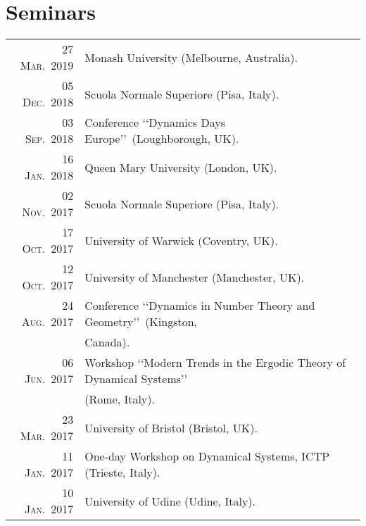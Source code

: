\documentclass[a4paper,10pt]{article}
\begin{document}

\section{Seminars}
\begin{longtable}{rl}	
%
\textsc{27 Mar.~2019} & Monash University (Melbourne, Australia). \\
%
\textsc{05 Dec.~2018} & Scuola Normale Superiore (Pisa, Italy). \\ 
%
\textsc{03 Sep.~2018} & Conference \lq\lq Dynamics Days Europe\rq\rq\ (Loughborough, UK). \\
%
\textsc{16 Jan.~2018} & Queen Mary University (London, UK). \\
%
\textsc{02 Nov.~2017} & Scuola Normale Superiore (Pisa, Italy).\\
%
\textsc{17 Oct.~2017} & University of Warwick (Coventry, UK). \\
%
\textsc{12 Oct.~2017} & University of Manchester (Manchester, UK). \\
%
\textsc{24 Aug.~2017} & Conference \lq\lq Dynamics in Number Theory and Geometry\rq\rq\ (Kingston, \\
& Canada). \\
%
\textsc{06 Jun.~2017} & Workshop \lq\lq Modern Trends in the Ergodic Theory of Dynamical Systems\rq\rq\\
&(Rome, Italy). \\
%
\textsc{23 Mar.~2017} & University of Bristol (Bristol, UK). \\
%
\textsc{11 Jan.~2017} & One-day Workshop on Dynamical Systems, ICTP (Trieste, Italy). \\
%
\textsc{10 Jan.~2017} & University of Udine (Udine, Italy). \\
\end{longtable}


\end{document}
